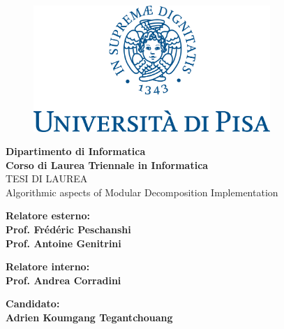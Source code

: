 \begin{titlepage} %
\begin{figure}[t] %
    \centering\includegraphics[width=0.80\textwidth]{marchio_unipi_pant541}\label{fig:figure-first-page}
\end{figure}

\vspace{20mm}

\begin{Large}
 \begin{center}
	\textbf{Dipartimento di Informatica\\ Corso di Laurea Triennale in Informatica\\}
	\vspace{2cm}
    {\LARGE{TESI DI LAUREA}}\\
	\vspace{2cm}
	{\Large{Algorithmic aspects of Modular Decomposition Implementation}}
\end{center}
\end{Large}

\vspace{15mm}

\begin{minipage}[t]{0.47\textwidth}
	{\large{\textbf{Relatore esterno:\\ Prof. Frédéric Peschanshi \\ Prof. Antoine Genitrini}}}

	\vspace{0.5cm}

	{\large{\textbf{Relatore interno: \\ Prof. Andrea Corradini}}}
\end{minipage}
\hfill
\begin{minipage}[t]{0.47\textwidth}\raggedleft
	{\large{\textbf{Candidato: \\ Adrien Koumgang Tegantchouang}}}
\end{minipage}

\vspace{20mm}


\end{titlepage}
